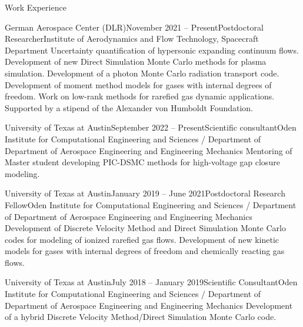 \documentclass{resume} %
\begin{document}

\begin{rSection}{Work Experience}

\begin{rSubsection}{German Aerospace Center (DLR)}{November 2021 -- Present}{Postdoctoral Researcher}{Institute of Aerodynamics and Flow Technology, Spacecraft Department}
Uncertainty quantification of hypersonic expanding continuum flows. Development of new Direct Simulation Monte Carlo methods for plasma simulation. Development of a photon Monte Carlo radiation transport code. Development of moment method models for gases with internal degrees of freedom. Work on low-rank methods for rarefied gas dynamic applications. Supported by a stipend of the Alexander von Humboldt Foundation.
\end{rSubsection}

\begin{rSubsection}{University of Texas at Austin}{September 2022 -- Present}{Scientific consultant}{Oden Institute for Computational Engineering and Sciences / Department of Department of Aerospace Engineering and Engineering Mechanics}
Mentoring of Master student developing PIC-DSMC methods for high-voltage gap closure modeling.
\end{rSubsection}

\begin{rSubsection}{University of Texas at Austin}{January 2019 -- June 2021}{Postdoctoral Research Fellow}{Oden Institute for Computational Engineering and Sciences / Department of Department of Aerospace Engineering and Engineering Mechanics}
Development of Discrete Velocity Method and Direct Simulation Monte Carlo codes for modeling of ionized rarefied gas flows. Development of new kinetic models for gases with internal degrees of freedom and chemically reacting gas flows.
\end{rSubsection}


\begin{rSubsection}{University of Texas at Austin}{July 2018 -- January 2019}{Scientific Consultant}{Oden Institute for Computational Engineering and Sciences  / Department of Department of Aerospace Engineering and Engineering Mechanics}
Development of a hybrid Discrete Velocity Method/Direct Simulation Monte Carlo code.
\end{rSubsection}


\end{rSection}
\end{document}
